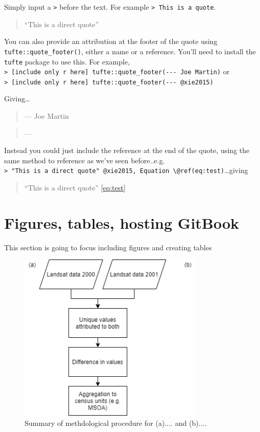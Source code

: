 \documentclass[
  12pt,
  oneside]{book}
\begin{document}
Simply input a \texttt{\textgreater{}} before the text. For example \texttt{\textgreater{}\ This\ is\ a\ quote}.

\begin{quote}
``This is a direct quote''
\end{quote}

You can also provide an attribution at the footer of the quote using \texttt{tufte::quote\_footer()}, either a name or a reference. You'll need to install the \texttt{tufte} package to use this. For example, \texttt{\textgreater{}\ {[}include\ only\ r\ here{]}\ tufte::quote\_footer(\textquotesingle{}-\/-\/-\ Joe\ Martin\textquotesingle{})} or \texttt{\textgreater{}\ {[}include\ only\ r\ here{]}\ tufte::quote\_footer(\textquotesingle{}-\/-\/-\ @xie2015\textquotesingle{})}

Giving\ldots{}

\begin{quote}
\hfill --- Joe Martin
\end{quote}

\begin{quote}
\hfill --- \textcite{xie2015}
\end{quote}

Instead you could just include the reference at the end of the quote, using the same method to reference as we've seen before..e.g. \texttt{\textgreater{}\ "This\ is\ a\ direct\ quote"\ @xie2015,\ Equation\ \textbackslash{}@ref(eq:test)}\ldots giving

\begin{quote}
``This is a direct quote'' \textcite{xie2015} \eqref{eq:test}
\end{quote}

\hypertarget{figures-tables-hosting-gitbook}{%
\chapter{Figures, tables, hosting GitBook}\label{figures-tables-hosting-gitbook}}

This section is going to focus including figures and creating tables

\begin{figure}
\includegraphics[width=250pt]{general_images/example_flow} \caption{Summary of methdological procedure for (a).... and (b)....}\label{fig:methodsflow}
\end{figure}
\end{document}
